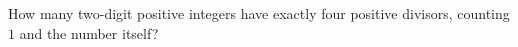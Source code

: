 How many two-digit positive integers have exactly four positive divisors, counting $1$ and the number itself?
